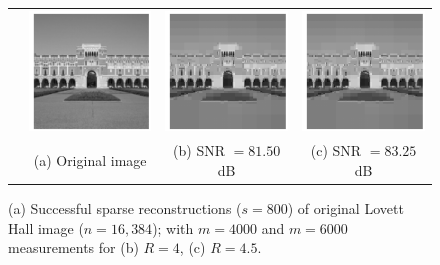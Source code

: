\begin{figure}[t!]
\begin{center}
\begin{tabular}{cccc}
			\rotatebox{90}{$~~~~~~~m=6000$} &
			\includegraphics[width=0.32\linewidth]{./fig/lovett_original.pdf} &
			\includegraphics[width=0.32\linewidth]{./fig/lovett_r4_m_6000_s_800.pdf} & 
			\includegraphics[width=0.32\linewidth]{./fig/lovett_r450_m_6000_s_800.pdf}  \\
			& \small{(a) Original image} & \small{(b) SNR $=81.50$dB} & %
			\small{(c) SNR $=83.25$dB} \\
		\end{tabular}
	\end{center}
	\caption{{(a) Successful sparse reconstructions ($s=800$) of original Lovett Hall image ($n=16,384$); with $m=4000$ and $m=6000$ measurements for (b) $R=4$, (c) $R=4.5$.}}
	\label{fig:lovett}
\end{figure}

